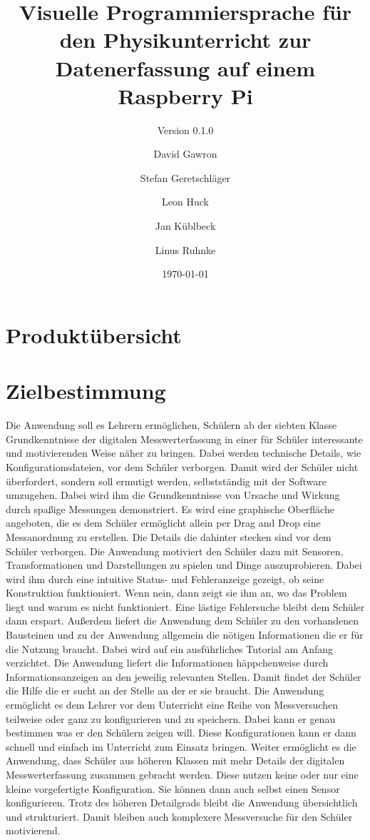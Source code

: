 \documentclass[parskip=full]{scrartcl}
\title{Visuelle Programmiersprache für den Physikunterricht zur Datenerfassung auf einem Raspberry Pi}
\subtitle{Version 0.1.0}
\author{David Gawron \and Stefan Geretschläger \and Leon Huck \and Jan Küblbeck \and Linus Ruhnke}
\date{\today}
\begin{document}
\maketitle

\newpage

\tableofcontents 					%

\section{Produktübersicht}



\section{Zielbestimmung}

Die Anwendung soll es Lehrern ermöglichen, Schülern ab der siebten Klasse Grundkenntnisse der digitalen Messwerterfassung in einer für Schüler interessante und motivierenden Weise näher zu bringen. Dabei werden technische Details, wie Konfigurationsdateien, vor dem Schüler verborgen. Damit wird der Schüler nicht überfordert, sondern soll ermutigt werden, selbstständig mit der Software umzugehen. Dabei wird ihm die Grundkenntnisse von Ursache und Wirkung durch spaßige Messungen demonstriert.
\newline 
Es wird eine graphische Oberfläche angeboten, die es dem Schüler ermöglicht allein per Drag and Drop eine Messanordnung zu erstellen. Die Details die dahinter stecken sind vor dem Schüler verborgen. Die Anwendung motiviert den Schüler dazu mit Sensoren, Transformationen und Darstellungen zu spielen und Dinge auszuprobieren. Dabei wird ihm durch eine intuitive Status- und Fehleranzeige gezeigt, ob seine Konstruktion funktioniert. Wenn nein, dann zeigt sie ihm an, wo das Problem liegt und warum es nicht funktioniert. Eine lästige Fehlersuche bleibt dem Schüler dann erspart.
\newline
 Außerdem liefert die Anwendung dem Schüler zu den vorhandenen Bausteinen und zu der Anwendung allgemein die nötigen Informationen die er für die Nutzung braucht. Dabei wird auf ein ausführliches Tutorial am Anfang verzichtet. Die Anwendung liefert die Informationen häppchenweise durch Informationsanzeigen an den jeweilig relevanten Stellen. Damit findet der Schüler die Hilfe die er sucht an der Stelle an der er sie braucht. 
\newline
Die Anwendung ermöglicht es dem Lehrer vor dem Unterricht eine Reihe von Messversuchen teilweise oder ganz zu konfigurieren und zu speichern. Dabei kann er genau bestimmen was er den Schülern zeigen will. Diese Konfigurationen kann er dann schnell und einfach im Unterricht zum Einsatz bringen.
\newline  
Weiter ermöglicht es die Anwendung, dass Schüler aus höheren Klassen mit mehr Details der digitalen Messwerterfassung zusammen gebracht werden. Diese nutzen keine oder nur eine kleine vorgefertigte Konfiguration. Sie können dann auch selbst einen Sensor konfigurieren. Trotz des höheren Detailgrads bleibt die Anwendung übersichtlich und strukturiert. Damit bleiben auch komplexere Messversuche für den Schüler motivierend.
\newline
\end{document}
